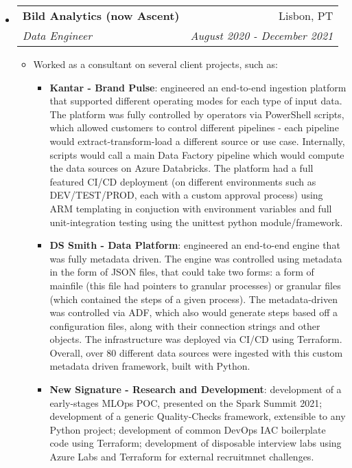 \documentclass[letterpaper,11pt]{article} \newlength{\outerbordwidth} \pagestyle{empty}
\makeatletter
\newcommand{\resitem}[1]{\item #1 \vspace{-2pt}}
\newcommand{\ressubheading}[4]{
\begin{tabular*}{6.5in}{l@{\cftdotfill{\cftsecdotsep}\extracolsep{\fill}}r}
		\textbf{#1} & #2 \\
		\textit{#3} & \textit{#4} \\
\end{tabular*}\vspace{-6pt}}
\makeatother
\begin{document}
\begin{itemize}
\item
    \ressubheading{Bild Analytics (now Ascent)}{Lisbon, PT}{Data Engineer}{August 2020 - December 2021}
	\begin{itemize}
      \resitem{Worked as a consultant on several client projects, such as:}
        \begin{itemize}
                \resitem{\textbf{Kantar - Brand Pulse}: engineered an end-to-end ingestion platform that supported different operating modes for each type of input data. The platform was fully controlled by operators via PowerShell scripts, which allowed customers to control different pipelines - each pipeline would extract-transform-load a different source or use case. Internally, scripts would call a main Data Factory pipeline which would compute the data sources on Azure Databricks. The platform had a full featured CI/CD deployment (on different environments such as DEV/TEST/PROD, each with a custom approval process) using ARM templating in conjuction with environment variables and full unit-integration testing using the unittest python module/framework.}
                \resitem{\textbf{DS Smith - Data Platform}: engineered an end-to-end engine that was fully metadata driven. The engine was controlled using metadata in the form of JSON files, that could take two forms: a form of mainfile (this file had pointers to granular processes) or granular files (which contained the steps of a given process). The metadata-driven was controlled via ADF, which also would generate steps based off a configuration files, along with their connection strings and other objects. The infrastructure was deployed via CI/CD using Terraform. Overall, over 80 different data sources were ingested with this custom metadata driven framework, built with Python.}
                \resitem{\textbf{New Signature - Research and Development}: development of a early-stages MLOps POC, presented on the Spark Summit 2021; development of a generic Quality-Checks framework, extensible to any Python project; development of common DevOps IAC boilerplate code using Terraform; development of disposable interview labs using Azure Labs and Terraform for external recruitmnet challenges.}
        \end{itemize}
	\end{itemize}



\end{itemize}
\end{document}
